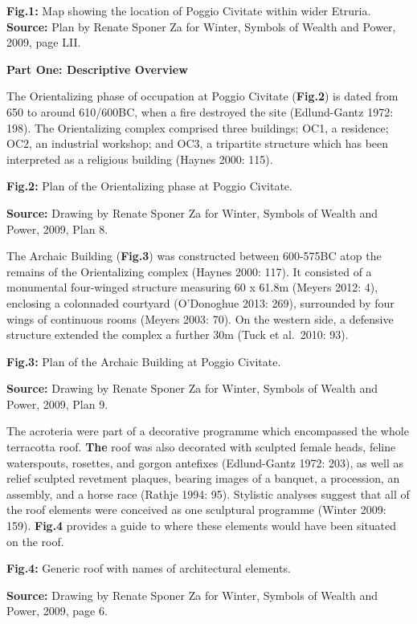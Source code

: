 \textbf{Fig.1:} Map showing the location of Poggio Civitate within wider
Etruria.\textbf{\\
Source:} Plan by Renate Sponer Za for Winter, Symbols of Wealth and
Power, 2009, page LII.

\textbf{Part One: Descriptive Overview}

The Orientalizing phase of occupation at Poggio Civitate
(\textbf{Fig.2}) is dated from 650 to around 610/600BC, when a fire
destroyed the site (Edlund-Gantz 1972: 198). The Orientalizing complex
comprised three buildings; OC1, a residence; OC2, an industrial
workshop; and OC3, a tripartite structure which has been interpreted as
a religious building (Haynes 2000: 115).

\textbf{Fig.2:} Plan of the Orientalizing phase at Poggio Civitate.

\textbf{Source:} Drawing by Renate Sponer Za for Winter, Symbols of
Wealth and Power, 2009, Plan 8.

The Archaic Building (\textbf{Fig.3}) was constructed between 600-575BC
atop the remains of the Orientalizing complex (Haynes 2000: 117). It
consisted of a monumental four-winged structure measuring 60 x 61.8m
(Meyers 2012: 4), enclosing a colonnaded courtyard (O'Donoghue 2013:
269), surrounded by four wings of continuous rooms (Meyers 2003: 70). On
the western side, a defensive structure extended the complex a further
30m (Tuck et al.~2010: 93).

\textbf{Fig.3:} Plan of the Archaic Building at Poggio Civitate.

\textbf{Source:} Drawing by Renate Sponer Za for Winter, Symbols of
Wealth and Power, 2009, Plan 9.

The acroteria were part of a decorative programme which encompassed the
whole terracotta roof. \textbf{The} roof was also decorated with
sculpted female heads, feline waterspouts, rosettes, and gorgon
antefixes (Edlund-Gantz 1972: 203), as well as relief sculpted revetment
plaques, bearing images of a banquet, a procession, an assembly, and a
horse race (Rathje 1994: 95). Stylistic analyses suggest that all of the
roof elements were conceived as one sculptural programme (Winter 2009:
159). \textbf{Fig.4} provides a guide to where these elements would have
been situated on the roof.

\textbf{Fig.4:} Generic roof with names of architectural elements.

\textbf{Source:} Drawing by Renate Sponer Za for Winter, Symbols of
Wealth and Power, 2009, page 6.

